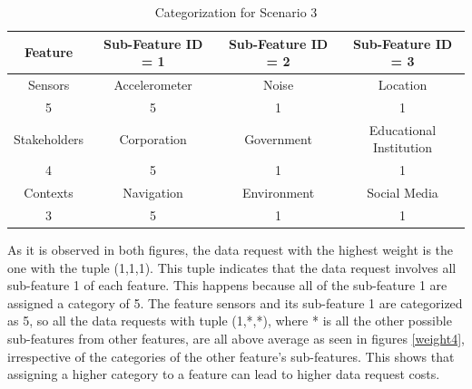 \begin{table}[h!]
  \centering
  \caption{Categorization for Scenario 3}
  \label{tab:scenario4}
  \begin{tabular}{cccc}
    \toprule
    Feature & Sub-Feature ID = 1 & Sub-Feature ID = 2 & Sub-Feature ID = 3\\
    \midrule
    Sensors & Accelerometer & Noise & Location\\
     5 & 5 & 1 & 1\\ \hhline{====}
     Stakeholders & Corporation & Government & Educational Institution\\
     4 & 5 & 1 & 1\\ \hhline{====}
     Contexts & Navigation & Environment & Social Media\\
     3 & 5 & 1 & 1\\ 
    \bottomrule
  \end{tabular}
\end{table}

As it is observed in both figures, the data request with the highest weight is the one with the tuple (1,1,1). This tuple indicates that the data request involves all sub-feature 1 of each feature. This happens because all of the sub-feature 1 are assigned a category of 5. The feature sensors and its sub-feature 1 are categorized as 5, so all the data requests
with tuple (1,*,*), where * is all the other possible sub-features from other features, are all above average as seen in figures \ref{weight4}, irrespective of the categories of the other feature's sub-features. This shows that assigning a higher category to a feature can lead to higher data request costs. 



%

